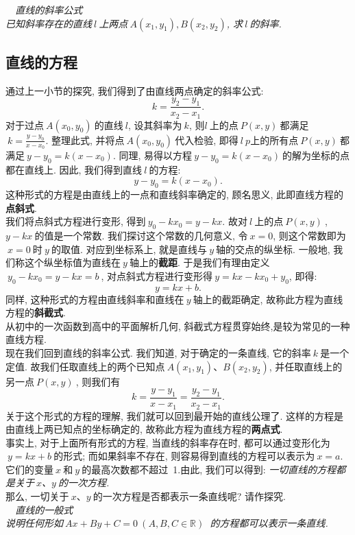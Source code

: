     {\it {}\ \ 直线的斜率公式\\
    \indent \indent 已知斜率存在的直线$\ l\ $上两点$\ A(x_1,y_1),B(x_2,y_2)$, 求$\ l\ $的斜率.\\}
    \subsection{直线的方程}
    通过上一小节的探究, 我们得到了由直线两点确定的斜率公式:$$k=\frac{y_2-y_1}{x_2-x_1}.$$
    \indent 对于过点$\ A(x_0,y_0)\ $的直线$\ l$, 设其斜率为$\ k$, 则$l\ $上的点$\ P(x,y)\ $都满足$\ k=\displaystyle \frac{y-y_0}{x-x_0}.$ 整理此式, 并将点$\ A(x_0,y_0)\ $代入检验, 即得$\ l\ p$上的所有点$\ P(x,y)\ $都满足$\ y-y_0=k(x-x_0).$ 同理, 易得以方程$\ y-y_0=k(x-x_0)\ $的解为坐标的点都在直线上. 因此, 我们得到直线$\ l\ $的方程:$$y-y_0=k(x-x_0).$$
    \indent 这种形式的方程是由直线上的一点和直线斜率确定的, 顾名思义, 此即直线方程的{\bf 点斜式}.\\
    \indent 我们将点斜式方程进行变形, 得到$\ y_0-kx_0=y-kx.$ 故对$\ l\ $上的点$\ P(x,y)\ $, $y-kx\ $的值是一个常数. 我们探讨这个常数的几何意义, 令$\ x=0$, 则这个常数即为$\ x=0\ $时$\ y\ $的取值. 对应到坐标系上, 就是直线与$\ y\ $轴的交点的纵坐标. 一般地, 我们称这个纵坐标值为直线在$\ y\ $轴上的{\bf 截距}. 于是我们有理由定义$\ y_0-kx_0=y-kx=b\ $, 对点斜式方程进行变形得$\ y=kx-kx_0+y_0$, 即得:$$y=kx+b.$$
    \indent 同样, 这种形式的方程由直线斜率和直线在$\ y\ $轴上的截距确定, 故称此方程为直线方程的{\bf 斜截式}.\\
    \indent 从初中的一次函数到高中的平面解析几何, 斜截式方程贯穿始终,是较为常见的一种直线方程.\\
    \indent 现在我们回到直线的斜率公式. 我们知道, 对于确定的一条直线, 它的斜率$\ k\ $是一个定值. 故我们任取直线上的两个已知点$\ A(x_1,y_1)$、$B(x_2,y_2)$, 并任取直线上的另一点$\ P(x,y)\ $, 则我们有$$k=\frac{y-y_1}{x-x_1}=\frac{y_2-y_1}{x_2-x_1}.$$
    \indent 关于这个形式的方程的理解, 我们就可以回到最开始的直线公理了. 这样的方程是由直线上两已知点的坐标确定的, 故称此方程为直线方程的{\bf 两点式}.\\
    \indent 事实上, 对于上面所有形式的方程, 当直线的斜率存在时, 都可以通过变形化为$\ y=kx+b\ $的形式; 而如果斜率不存在, 则容易得到直线的方程可以表示为$\ x=a$. 它们的变量$\ x\ $和$\ y\ $的最高次数都不超过\ 1.由此, 我们可以得到: {\it 一切直线的方程都是关于$\ x$、$y\ $的一次方程.}\\
    \indent 那么, 一切关于$\ x$、$y\ $的一次方程是否都表示一条直线呢? 请作探究. \\
     {\it {}\ \ 直线的一般式\\
    \indent \indent 说明任何形如$\ Ax+By+C=0\ (A,B,C\in\mathbb{R})\ $ 的方程都可以表示一条直线.\\}

